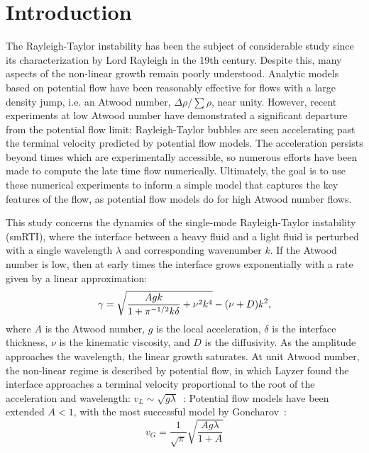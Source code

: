 \section{Introduction}

The Rayleigh-Taylor instability has been the subject of considerable study since its characterization by Lord Rayleigh in the 19th century.
Despite this, many aspects of the non-linear growth remain poorly understood.
Analytic models based on potential flow have been reasonably effective for flows with a large density jump, i.e. an Atwood number, $\Delta \rho / \sum \rho$, near unity.
However, recent experiments at low Atwood number have demonstrated a significant departure from the potential flow limit:
Rayleigh-Taylor bubbles are seen accelerating past the terminal velocity predicted by potential flow models.
The acceleration persists beyond times which are experimentally accessible, so numerous efforts have been made to compute the late time flow numerically.
Ultimately, the goal is to use these numerical experiments to inform a simple model that captures the key features of the flow, as potential flow models do for high Atwood number flows.

This study concerns the dynamics of the single-mode Rayleigh-Taylor instability (smRTI), where the interface between a heavy fluid and a light fluid is perturbed with a single wavelength $\lambda$ and corresponding wavenumber $k$.
If the Atwood number is low, then at early times the interface grows exponentially with a rate given by a linear approximation:
\begin{equation} \elabel{duff0}
\gamma = \sqrt{\frac{A g k}{1 + \pi^{-1/2} k \delta} + \nu^2 k^4} - (\nu + D) k^2,
\end{equation}
where $A$ is the Atwood number,
$g$ is the local acceleration,
$\delta$ is the interface thickness,
$\nu$ is the kinematic viscosity, and
$D$ is the diffusivity.
As the amplitude approaches the wavelength, the linear growth saturates.
At unit Atwood number, the non-linear regime is described by potential flow, in which Layzer found the interface approaches a terminal velocity proportional to the root of the acceleration and wavelength: $v_L \sim \sqrt{g \lambda}$~\cite{Layzer1955}:
Potential flow models have been extended $A < 1$, with the most successful model by Goncharov~\cite{Goncharov2002}:
\begin{equation}
v_G = \frac{1}{\sqrt{\pi}} \sqrt{\frac{A g \lambda}{1+A}}
\end{equation}


